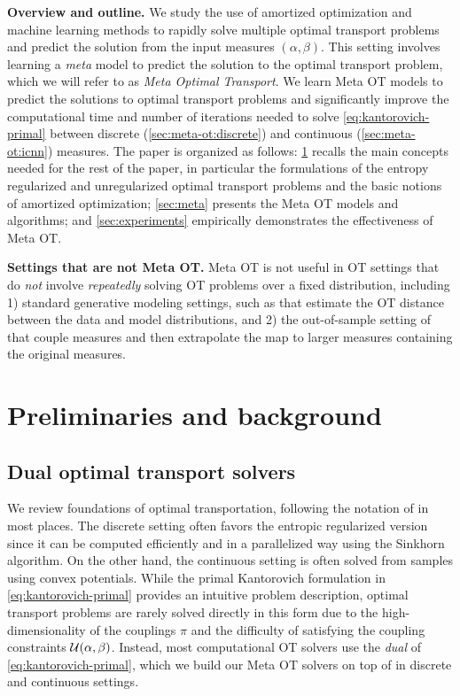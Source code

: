 \documentclass{article}
\begin{document}
\textbf{Overview and outline.}
We study the use of amortized optimization and machine learning
methods to rapidly solve multiple optimal transport problems
and predict the solution from the input measures $(\alpha, \beta)$.
This setting involves learning a \emph{meta} model
to predict the solution to the optimal transport problem,
which we will refer to as \emph{Meta Optimal Transport}.
We learn Meta OT models to predict the solutions to optimal
transport problems and significantly improve the computational
time and number of iterations needed to solve
\cref{eq:kantorovich-primal} between
discrete (\cref{sec:meta-ot:discrete}) and
continuous (\cref{sec:meta-ot:icnn}) measures. The paper is organized
as follows: \cref{sec:preliminaries_andback} recalls the main
concepts needed for the rest of the paper, in particular the
formulations of the entropy regularized and unregularized optimal
transport problems and the basic notions of amortized optimization;
\cref{sec:meta} presents the Meta OT models and algorithms; and
\cref{sec:experiments} empirically demonstrates the
effectiveness of Meta OT.

\textbf{Settings that are not Meta OT.}
Meta OT is not useful in OT settings that do \emph{not} involve
\emph{repeatedly} solving OT problems over a fixed distribution,
including
1) standard generative modeling settings, such
as \citet{arjovsky2017wasserstein} that estimate the
OT distance between the data and model distributions,
and 2) the out-of-sample setting
of \citet{seguy2018large,perrot2016mapping} that
couple measures and then extrapolate the map to
larger measures containing the original measures.


\section{Preliminaries and background}\label{sec:preliminaries_andback}
\subsection{Dual optimal transport solvers}
We review foundations of optimal transportation, following
the notation of \citet{peyre2019computational} in most places.
The discrete setting often favors the entropic
regularized version since it can be computed efficiently
and in a parallelized way using the Sinkhorn algorithm.
On the other hand, the continuous setting is often solved from
samples using convex potentials.
While the primal Kantorovich formulation in \cref{eq:kantorovich-primal}
provides an intuitive problem description, optimal transport problems
are rarely solved directly in this form due to the high-dimensionality
of the couplings $\pi$ and the difficulty of satisfying the
coupling constraints ${\mathcal{U}}(\alpha, \beta)$.
Instead, most computational OT solvers use the \emph{dual} of \cref{eq:kantorovich-primal},
which we build our
Meta OT solvers on top of in discrete and continuous settings.
\end{document}
